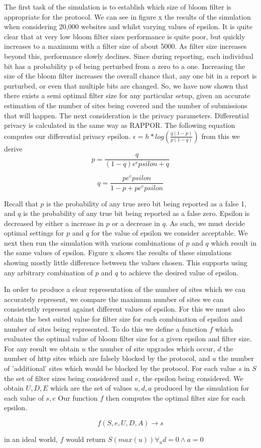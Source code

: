 \documentclass[11pt]{article}
\begin{document}
The first task of the simulation is to establish which size of bloom filter is appropriate for the protocol. We can see in figure x the results of the simulation when considering 20,000 websites and whilst varying values of epsilon. It is quite clear that at very low bloom filter sizes performance is quite poor, but quickly increases to a maximum with a filter size of about 5000. As filter size increases beyond this, performance slowly declines. Since during reporting, each individual bit has a probability p of being perturbed from a zero to a one. Increasing the size of the bloom filter increases the overall chance that, any one bit in a report is purturbed, or even that multiple bits are changed. So, we have now shown that there exists a semi optimal filter size for any particular setup, given an accurate estimation of the number of sites being covered and the number of submissions that will happen. The next consideration is the privacy parameters. Differential privacy is calculated in the same way as RAPPOR. The following equation computes our differential privacy epsilon. \(\epsilon = h * log(\frac{q(1-p)}{p(1-q)})\) from this we derive $$p = \frac{q}{(1-q)e^epsilon + q}$$

$$q = \frac{p e^epsilon}{1-p+pe^epsilon}$$

Recall that \(p\) is the probability of any true zero bit being reported as a false 1, and \(q\) is the probability of any true bit being reported as a false zero. Epsilon is decreased by either a increase in \(p\) or a decrease in \(q\). As such, we must decide optimal settings for \(p\) and \(q\) for the value of epsilon we consider acceptable. We next then run the simulation with various combinations of \(p\) and \(q\) which result in the same values of epsilon. Figure x shows the results of these simulations showing mostly little difference between the values chosen. This supports using any arbitrary combination of \(p\) and \(q\) to achieve the desired value of epsilon.

In order to produce a clear representation of the number of sites which we can accurately represent, we compare the maximum number of sites we can consistently represent against different values of epsilon. For this we must also obtain the best suited value for filter size for each combination of epsilon and number of sites being represented. To do this we define a function \(f\) which evaluates the optimal value of bloom filter size for a given epsilon and filter size. For any result we obtain \(u\) the number of site upgrades which occur, \(d\) the number of http sites which are falsely blocked by the protocol, and \(a\) the number of 'additional' sites which would be blocked by the protocol.
For each value \(s\) in \(S\) the set of filter sizes being considered and \(e\), the epsilon being considered. We obtain \(U,D,E\) which are the set of values \(u,d,a\) produced by the simulation for each value of \(s,e\)
Our function \(f\) then computes the optimal filter size for each epsilon.

$$f(S,e,U,D,A) \to s$$

in an ideal world, \(f\) would return \(S(max(u)) \forall_u d=0 \wedge a=0\)
\end{document}
